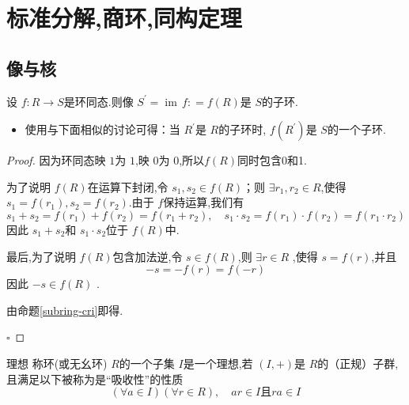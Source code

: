 \documentclass[lang=cn,12pt,color=green,fontset=none,pad]{elegantbook}
\begin{document}
\chapter{标准分解,商环,同构定理}



\section{像与核}
\begin{proposition}
    设 $ f:R\to S    $是环同态.则像 $ S^{\prime} = \operatorname{im}\,f: = f\left( R \right)  $是 $ S $的子环.  
\end{proposition}

\begin{remark}
    \begin{itemize}
        \item 使用与下面相似的讨论可得：当 $ R^{\prime}  $是 $ R $的子环时, $ f\left( R^{\prime}  \right)  $是 $ S $的一个子环.    
    \end{itemize}
    
\end{remark}
\begin{proof}


    因为环同态映 $ 1 $为 $ 1 $,映 $ 0 $为 $ 0 $,所以$ f \left( R \right)  $同时包含0和1.
    

    为了说明 $ f\left( R \right)  $在运算下封闭,令 $ s_1,s_2\in f\left( R \right)  $；则 $ \exists r_1,r_2\in R $,使得 $ s_1=f\left( r_1 \right),s_2=f\left( r_2 \right)   $.由于 $ f $保持运算,我们有  $$
    s_1+ s_2=f\left( r_1 \right)+ f\left( r_2 \right)=f\left( r_1+ r_2 \right),\quad s_1\cdot s_2=f\left( r_1  \right)\cdot f\left( r_2 \right)= f\left( r_1\cdot r_2 \right)      
    $$    因此 $ s_1+ s_2 $和 $ s_1\cdot s_2 $位于 $ f\left( R \right)  $中.
    

    最后,为了说明 $ f\left( R \right)  $包含加法逆,令 $ s \in f\left( R \right)  $,则 $ \exists r \in R $   ,使得 $ s = f\left( r \right)  $,并且 $$
    -s= -f\left( r \right)= f\left( -r \right)  
    $$因此 $ -s \in f\left( R \right)  $  .


    由命题\ref{subring-cri}即得.


    \hfill $\square$
\end{proof} 


\begin{definition}{理想}
    称环(或无幺环) $ R $的一个子集 $ I $是一个理想,若 $ \left( I,+  \right)  $是 $ R $的（正规）子群,且满足以下被称为是“吸收性”的性质 $$
    \left( \forall a \in I \right) \left( \forall r\in R \right),\quad ar \in I \text{且} ra \in I  
    $$
\end{definition}
\end{document}
